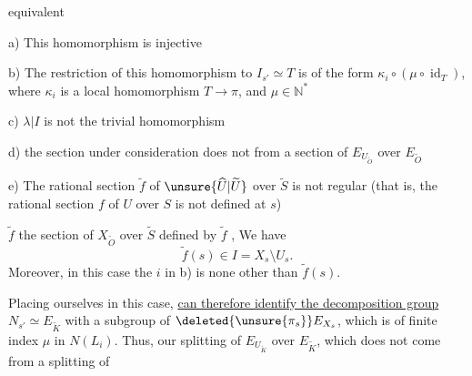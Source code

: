 equivalent

a) This homomorphism is injective

b) The restriction of this homomorphism to $I_{s'}\simeq T$ is of the form $\kappa_i\circ(\mu\circ\operatorname{id}_T)$, where $\kappa_i$ is a local homomorphism $T\longrightarrow\pi$, and $\mu\in\mathbb N^{*}$

c) $\lambda\vert I$ is not the trivial homomorphism

d) the section under consideration  does not  from a section of $E_{U_{\widetilde O}}$ over $E_{\widetilde O}$

e) The rational  section $\widetilde f$ of $\unsure{\widehat U|\widetilde U}$ over $\widetilde S$ is not regular (that is, the rational section $f$ of $U$ over $S$ is not defined at $s$)

  $\widetilde f$  the section of $X_{\widetilde O}$ over $\widetilde S$ defined by $\widetilde f$ ,  We have
\[
\widetilde f(s)\in I=X_s\setminus U_s.
\]
Moreover, in this case the $i$ in b) is none other than $\widetilde f(s)$.

Placing ourselves in this case, \uline{ can therefore identify the decomposition group} $N_{s'}\simeq E_{\widetilde K}$ with a subgroup of $\deleted{\unsure{\pi_s}}E_{X_s}$,  which is of finite index $\mu$ in  $N(L_i)$. Thus, our splitting  of $E_{U_{\widetilde K}}$  over $E_{\widetilde K}$, which does not come from a splitting of

